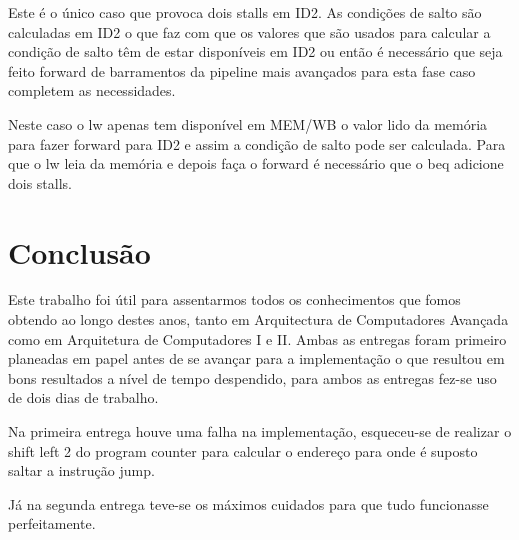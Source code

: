 \documentclass[pdftex,12pt,a4paper]{report}
\begin{document}
Este é o único caso que provoca dois stalls em ID2. As condições de salto são calculadas em ID2 o que faz com que os valores que são usados para calcular a condição de salto têm de estar disponíveis em ID2 ou então é necessário que seja feito forward de barramentos da pipeline mais avançados para esta fase caso completem as necessidades. 

Neste caso o lw apenas tem disponível em MEM/WB o valor lido da memória para fazer forward para ID2 e assim a condição de salto pode ser calculada. Para que o lw leia da memória e depois faça o forward é necessário que o beq adicione dois stalls.

\newpage
\section{Conclusão}

Este trabalho foi útil para assentarmos todos os conhecimentos que fomos obtendo ao longo destes anos, tanto em Arquitectura de Computadores Avançada como em Arquitetura de Computadores I e II. Ambas as entregas foram primeiro planeadas em papel antes de se avançar para a implementação o que resultou em bons resultados a nível de tempo despendido, para ambos as entregas fez-se uso de dois dias de trabalho.

Na primeira entrega houve uma falha na implementação, esqueceu-se de realizar o shift left 2 do program counter para calcular o endereço para onde é suposto saltar a instrução jump.

Já na segunda entrega teve-se os máximos cuidados para que tudo funcionasse perfeitamente.
\end{document}
